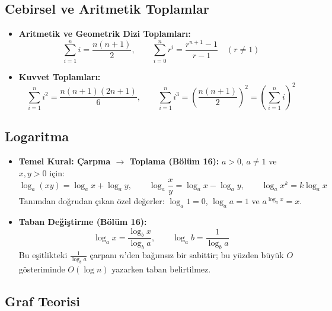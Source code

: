 \subsection{Cebirsel ve Aritmetik Toplamlar}

\begin{itemize}
    \item \textbf{Aritmetik ve Geometrik Dizi Toplamları:}
    \[
    \sum_{i=1}^n i = \frac{n(n+1)}{2}, \qquad \sum_{i=0}^n r^i = \frac{r^{n+1}-1}{r-1} \quad (r \ne 1)
    \]
    \item \textbf{Kuvvet Toplamları:}
    \[
    \sum_{i=1}^n i^2 = \frac{n(n+1)(2n+1)}{6}, \qquad \sum_{i=1}^n i^3 = \left( \frac{n(n+1)}{2} \right)^2 = \left( \sum_{i=1}^n i \right)^2
    \]
\end{itemize}

\subsection{Logaritma}

\begin{itemize}
    \item \textbf{Temel Kural: Çarpma $\to$ Toplama (Bölüm 16):}
    $a > 0$, $a \ne 1$ ve $x, y > 0$ için:
    \[
    \log_a (xy) = \log_a x + \log_a y, \qquad
    \log_a \frac{x}{y} = \log_a x - \log_a y, \qquad
    \log_a x^k = k \log_a x
    \]
    Tanımdan doğrudan çıkan özel değerler: $\log_a 1 = 0$, $\log_a a = 1$ ve $a^{\log_a x} = x$.

    \item \textbf{Taban Değiştirme (Bölüm 16):}
    \[
    \log_a x = \frac{\log_b x}{\log_b a}, \qquad \log_a b = \frac{1}{\log_b a}
    \]
    Bu eşitlikteki $\frac{1}{\log_b a}$ çarpanı $n$'den bağımsız bir sabittir; bu yüzden büyük $O$ gösteriminde $O(\log n)$ yazarken taban belirtilmez.
\end{itemize}

\subsection{Graf Teorisi}

